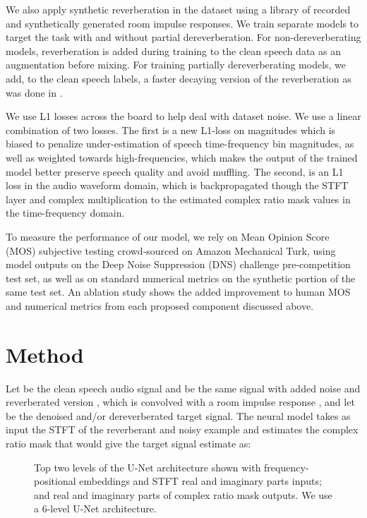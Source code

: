 \documentclass[english]{article}
\begin{document}
We also apply synthetic reverberation in the dataset using a library of recorded and synthetically generated room impulse responses. We train separate models to target the task with and without partial dereverberation. 
For non-dereverberating models, reverberation is added during training to the clean speech data as an augmentation before mixing. For training partially dereverberating models, we add, to the clean speech labels, a faster decaying version of the reverberation as was done in \cite{zhao2018late}.

We use L1 losses across the board to help deal with dataset noise. We use a linear combination of two losses. The first is a new L1-loss on magnitudes which is biased to penalize under-estimation of speech time-frequency bin magnitudes, as well as weighted towards high-frequencies, which makes the output of the trained model better preserve speech quality and avoid muffling. The second, is an L1 loss in the audio waveform domain, which is backpropagated though the STFT layer and complex multiplication to the estimated complex ratio mask values in the time-frequency domain. 


To measure the performance of our model, we rely on Mean Opinion Score (MOS) subjective testing crowd-sourced on Amazon Mechanical Turk, using model outputs on the Deep Noise Suppression (DNS) challenge \cite{dnschallengefinal} pre-competition test set, as well as on standard numerical metrics on the synthetic portion of the same test set. An ablation study shows the added improvement to human MOS and numerical metrics from each proposed component discussed above. 

\section{Method}

Let  be the clean speech audio signal and  be the same signal with added noise  and reverberated version , which is convolved with a room impulse response , and let  be the denoised and/or dereverberated target signal. The neural model  takes as input the STFT of the reverberant and noisy example  and estimates the complex ratio mask that would give the target signal estimate as:  


\begin{figure*}[h]

\begin{center}
\end{center}



\caption{Top two levels of the U-Net architecture shown with frequency-positional embeddings and STFT  real and imaginary parts inputs; and real and imaginary parts of complex ratio mask outputs. We use a 6-level U-Net architecture.}
\label{figunetandpos}
\end{figure*}
\end{document}
